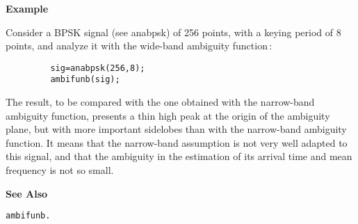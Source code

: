 \newpage

{\bf \large \sf Example}\\
\hspace*{1.5cm}
\begin{minipage}[t]{13.5cm}
Consider a BPSK signal (see {\ty anabpsk}) of 256 points, with a keying
period of 8 points, and analyze it with the wide-band ambiguity
function\,:
\begin{verbatim}
         sig=anabpsk(256,8);
         ambifunb(sig);
\end{verbatim}
The result, to be compared with the one obtained with the narrow-band
ambiguity function, presents a thin high peak at the origin of the
ambiguity plane, but with more important sidelobes than with the
narrow-band ambiguity function. It means that the narrow-band assumption is
not very well adapted to this signal, and that the ambiguity in the
estimation of its arrival time and mean frequency is not so small.
\end{minipage}
\vspace*{.5cm}


{\bf \large \sf See Also}\\
\hspace*{1.5cm}
\begin{minipage}[t]{13.5cm}
\begin{verbatim}
ambifunb.
\end{verbatim}
\end{minipage}

